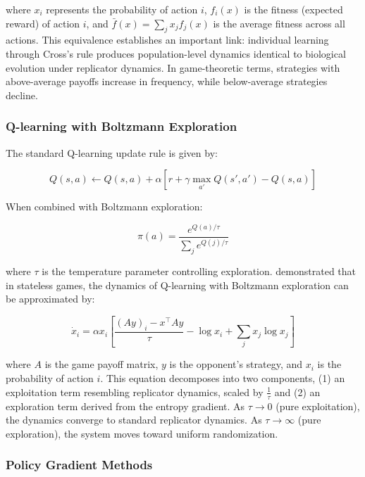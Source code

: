 \noindent where $x_i$ represents the probability of action $i$, $f_i(x)$ is the fitness (expected reward) of action $i$, and $\bar{f}(x) = \sum_j x_j f_j(x)$ is the average fitness across all actions. This equivalence establishes an important link: individual learning through Cross's rule produces population-level dynamics identical to biological evolution under replicator dynamics. In game-theoretic terms, strategies with above-average payoffs increase in frequency, while below-average strategies decline.

\subsubsection{Q-learning with Boltzmann Exploration}

The standard Q-learning update rule is given by:

\begin{equation}
Q(s,a) \leftarrow Q(s,a) + \alpha\left[r + \gamma\max_{a'}Q(s',a') - Q(s,a)\right]
\end{equation}

When combined with Boltzmann exploration:

\begin{equation}
\pi(a) = \frac{e^{Q(a)/\tau}}{\sum_j e^{Q(j)/\tau}}
\end{equation}

\noindent where $\tau$ is the temperature parameter controlling exploration. \citet{Tuyls2003} demonstrated that in stateless games, the dynamics of Q-learning with Boltzmann exploration can be approximated by:

\begin{equation}
\dot{x}_i = \alpha x_i\left[\frac{(Ay)_i - x^{\top}Ay}{\tau} - \log x_i + \sum_j x_j\log x_j\right]
\end{equation}

\noindent where $A$ is the game payoff matrix, $y$ is the opponent's strategy, and $x_i$ is the probability of action $i$. This equation decomposes into two components, (1) an exploitation term resembling replicator dynamics, scaled by $\frac{1}{\tau}$ and (2) an exploration term derived from the entropy gradient. As $\tau \rightarrow 0$ (pure exploitation), the dynamics converge to standard replicator dynamics. As $\tau \rightarrow \infty$ (pure exploration), the system moves toward uniform randomization. 

\subsubsection{Policy Gradient Methods}

